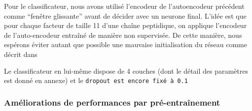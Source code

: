\documentclass[a4paper, 11pt, onecolumn]{article}
\begin{document}
Pour le classificateur, nous avons
utilisé l'encodeur de l'autoencodeur précédent comme ``fenêtre glissante''
avant de décider avec un neurone final. L'idée est que pour chaque facteur de
taille 11 d'une chaîne peptidique, on applique l'encodeur de l'auto-encodeur
entraîné de manière non supervisée. De cette manière, nous espérons éviter
autant que possible une mauvaise initialisation du réseau comme décrit dans \cite{vincent2010stacked}

Le classificateur en lui-même dispose de 4 couches (dont le détail des
paramètres est donné en annexe) et le \texttt{dropout est encore fixé à 0.1}

\subsubsection{Améliorations de performances par pré-entraînement}
\end{document}
